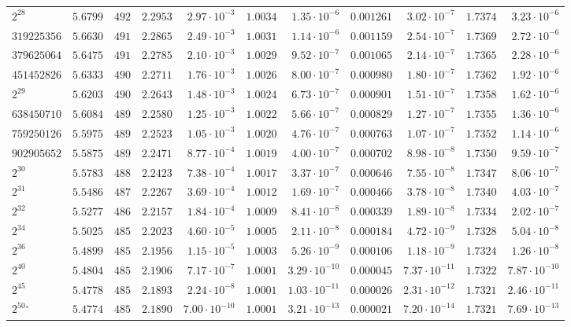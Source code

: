 {\begin{longtable}{@{}lrrrrrrrrrr@{}}
$2^{28}$ & $5.6799$ & $492$ & $2.2953$ & $2.97\cdot10^{-3}$ & $1.0034$ & $1.35\cdot10^{-6}$ & $0.001261$ & $3.02\cdot10^{-7}$ & $1.7374$ & $3.23\cdot10^{-6}$\\
$319225356$ & $5.6630$ & $491$ & $2.2865$ & $2.49\cdot10^{-3}$ & $1.0031$ & $1.14\cdot10^{-6}$ & $0.001159$ & $2.54\cdot10^{-7}$ & $1.7369$ & $2.72\cdot10^{-6}$\\
$379625064$ & $5.6475$ & $491$ & $2.2785$ & $2.10\cdot10^{-3}$ & $1.0029$ & $9.52\cdot10^{-7}$ & $0.001065$ & $2.14\cdot10^{-7}$ & $1.7365$ & $2.28\cdot10^{-6}$\\
$451452826$ & $5.6333$ & $490$ & $2.2711$ & $1.76\cdot10^{-3}$ & $1.0026$ & $8.00\cdot10^{-7}$ & $0.000980$ & $1.80\cdot10^{-7}$ & $1.7362$ & $1.92\cdot10^{-6}$\\
$2^{29}$ & $5.6203$ & $490$ & $2.2643$ & $1.48\cdot10^{-3}$ & $1.0024$ & $6.73\cdot10^{-7}$ & $0.000901$ & $1.51\cdot10^{-7}$ & $1.7358$ & $1.62\cdot10^{-6}$\\
$638450710$ & $5.6084$ & $489$ & $2.2580$ & $1.25\cdot10^{-3}$ & $1.0022$ & $5.66\cdot10^{-7}$ & $0.000829$ & $1.27\cdot10^{-7}$ & $1.7355$ & $1.36\cdot10^{-6}$\\
$759250126$ & $5.5975$ & $489$ & $2.2523$ & $1.05\cdot10^{-3}$ & $1.0020$ & $4.76\cdot10^{-7}$ & $0.000763$ & $1.07\cdot10^{-7}$ & $1.7352$ & $1.14\cdot10^{-6}$\\
$902905652$ & $5.5875$ & $489$ & $2.2471$ & $8.77\cdot10^{-4}$ & $1.0019$ & $4.00\cdot10^{-7}$ & $0.000702$ & $8.98\cdot10^{-8}$ & $1.7350$ & $9.59\cdot10^{-7}$\\
$2^{30}$ & $5.5783$ & $488$ & $2.2423$ & $7.38\cdot10^{-4}$ & $1.0017$ & $3.37\cdot10^{-7}$ & $0.000646$ & $7.55\cdot10^{-8}$ & $1.7347$ & $8.06\cdot10^{-7}$\\
$2^{31}$ & $5.5486$ & $487$ & $2.2267$ & $3.69\cdot10^{-4}$ & $1.0012$ & $1.69\cdot10^{-7}$ & $0.000466$ & $3.78\cdot10^{-8}$ & $1.7340$ & $4.03\cdot10^{-7}$\\
$2^{32}$ & $5.5277$ & $486$ & $2.2157$ & $1.84\cdot10^{-4}$ & $1.0009$ & $8.41\cdot10^{-8}$ & $0.000339$ & $1.89\cdot10^{-8}$ & $1.7334$ & $2.02\cdot10^{-7}$\\
$2^{34}$ & $5.5025$ & $485$ & $2.2023$ & $4.60\cdot10^{-5}$ & $1.0005$ & $2.11\cdot10^{-8}$ & $0.000184$ & $4.72\cdot10^{-9}$ & $1.7328$ & $5.04\cdot10^{-8}$\\
$2^{36}$ & $5.4899$ & $485$ & $2.1956$ & $1.15\cdot10^{-5}$ & $1.0003$ & $5.26\cdot10^{-9}$ & $0.000106$ & $1.18\cdot10^{-9}$ & $1.7324$ & $1.26\cdot10^{-8}$\\
$2^{40}$ & $5.4804$ & $485$ & $2.1906$ & $7.17\cdot10^{-7}$ & $1.0001$ & $3.29\cdot10^{-10}$ & $0.000045$ & $7.37\cdot10^{-11}$ & $1.7322$ & $7.87\cdot10^{-10}$\\
$2^{45}$ & $5.4778$ & $485$ & $2.1893$ & $2.24\cdot10^{-8}$ & $1.0001$ & $1.03\cdot10^{-11}$ & $0.000026$ & $2.31\cdot10^{-12}$ & $1.7321$ & $2.46\cdot10^{-11}$\\
$2^{50}$$^\circ$ & $5.4774$ & $485$ & $2.1890$ & $7.00\cdot10^{-10}$ & $1.0001$ & $3.21\cdot10^{-13}$ & $0.000021$ & $7.20\cdot10^{-14}$ & $1.7321$ & $7.69\cdot10^{-13}$\\
\end{longtable}
}

